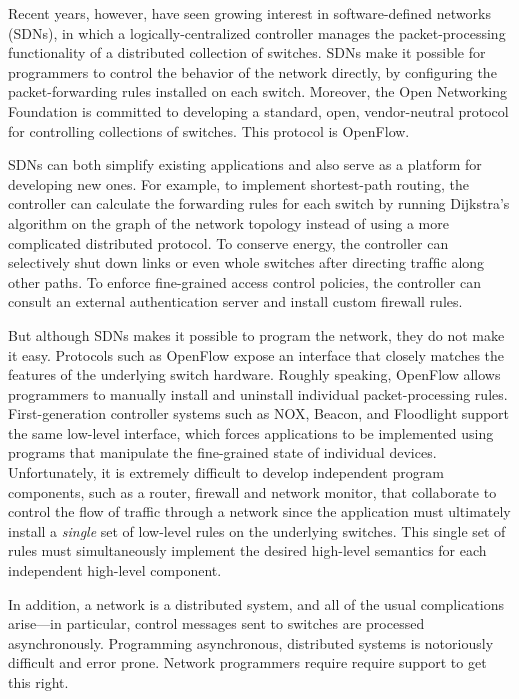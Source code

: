 \documentclass{article}
\begin{document}
Recent years, however, have seen growing interest in software-deﬁned
networks (SDNs), in which a logically-centralized controller manages
the packet-processing functionality of a distributed collection of
switches. SDNs make it possible for programmers to control the
behavior of the network directly, by conﬁguring the packet-forwarding
rules installed on each switch.  Moreover, the Open Networking
Foundation is committed to developing a standard, open, vendor-neutral
protocol for controlling collections of switches.  This protocol is
OpenFlow.

SDNs can both simplify existing applications and also serve as a
platform for developing new ones. For example, to implement
shortest-path routing, the controller can calculate the forwarding
rules for each switch by running Dijkstra’s algorithm on the graph of
the network topology instead of using a more complicated distributed
protocol. To conserve energy, the controller can selectively shut down
links or even whole switches after directing trafﬁc along other
paths. To enforce ﬁne-grained access control policies, the controller
can consult an external authentication server and install custom
firewall rules.

But although SDNs makes it possible to program the network, they do
not make it easy. Protocols such as OpenFlow expose an interface that
closely matches the features of the underlying switch
hardware. Roughly speaking, OpenFlow allows programmers to manually
install and uninstall individual packet-processing rules.
First-generation controller systems such as NOX, Beacon, and
Floodlight support the same low-level interface, which forces
applications to be implemented using programs that manipulate the
fine-grained state of individual devices.  Unfortunately, it is
extremely difficult to develop independent program components, such as
a router, firewall and network monitor, that collaborate to control
the flow of traffic through a network since the application must
ultimately install a \emph{single} set of low-level rules on the underlying
switches.  This single set of rules must simultaneously implement the
desired high-level semantics for each independent high-level
component.

In addition, a network is a distributed system, and all of the usual
complications arise—in particular, control messages sent to switches
are processed asynchronously. Programming asynchronous, distributed
systems is notoriously difficult and error prone.  Network programmers
require require support to get this right.
\end{document}
